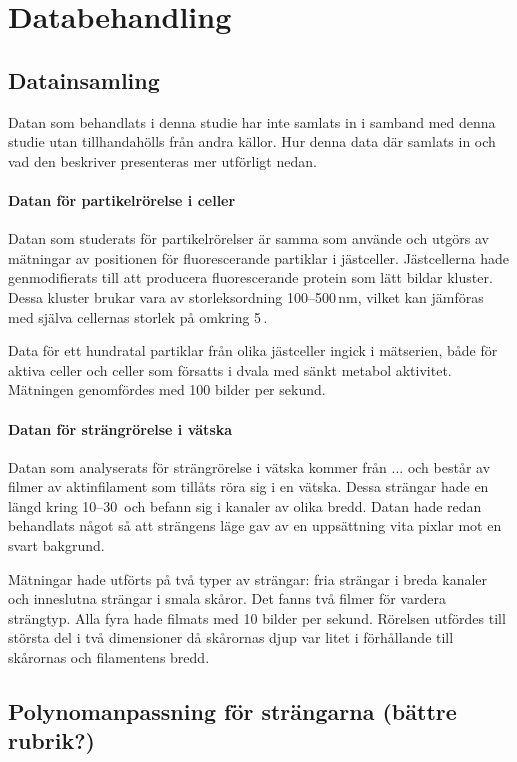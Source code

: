 \chapter{Databehandling}


\section{Datainsamling}
Datan som behandlats i denna studie har inte samlats in i samband med denna studie utan tillhandahölls från andra källor. Hur denna data där samlats in och vad den beskriver presenteras mer utförligt nedan.

\subsubsection{Datan för partikelrörelse i celler}
Datan som studerats för partikelrörelser är samma som \cite{Midtveldt_etal2016} använde och utgörs av mätningar av positionen för fluorescerande partiklar i jästceller. Jästcellerna hade genmodifierats till att producera fluorescerande protein som lätt bildar kluster. 
Dessa kluster brukar vara av storleksordning 100--500\,nm, vilket kan jämföras med själva cellernas storlek på omkring 5\,.

Data för ett hundratal partiklar från olika jästceller ingick i mätserien, både för aktiva celler och celler som försatts i dvala med sänkt metabol aktivitet. Mätningen genomfördes med 100 bilder per sekund.


\subsubsection{Datan för strängrörelse i vätska}

Datan som analyserats för strängrörelse i vätska kommer från ... och består av filmer av aktinfilament som tillåts röra sig i en vätska. Dessa strängar hade en längd kring 10--30\, och befann sig i kanaler av olika bredd. Datan hade redan behandlats något så att strängens läge gav av en uppsättning vita pixlar mot en svart bakgrund.

Mätningar hade utförts på två typer av strängar: fria strängar i breda kanaler och inneslutna strängar i smala skåror. Det fanns två filmer för vardera strängtyp. Alla fyra hade filmats med 10 bilder per sekund. Rörelsen utfördes till största del i två dimensioner då skårornas djup var litet i förhållande till skårornas och filamentens bredd.


\section{Polynomanpassning för strängarna (bättre rubrik?)}
\label{app:polynomanpassning}







